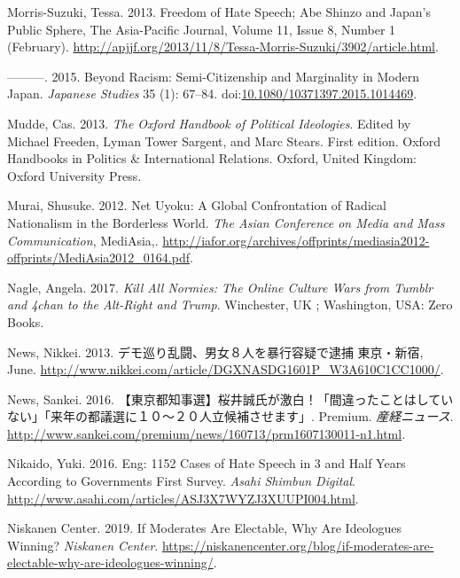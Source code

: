 \documentclass[10pt,british,A4paper,,openany]{memoir}
\begin{document}
\hypertarget{ref-morris-suzuki_freedom_2013}{}
Morris-Suzuki, Tessa. 2013. Freedom of Hate Speech; Abe Shinzo and
Japan's Public Sphere, The Asia-Pacific Journal, Volume 11, Issue 8,
Number 1 (February).
\url{http://apjjf.org/2013/11/8/Tessa-Morris-Suzuki/3902/article.html}.

\hypertarget{ref-morris-suzuki_beyond_2015}{}
---------. 2015. Beyond Racism: Semi-Citizenship and Marginality in
Modern Japan. \emph{Japanese Studies} 35 (1): 67--84.
doi:\href{https://doi.org/10.1080/10371397.2015.1014469}{10.1080/10371397.2015.1014469}.

\hypertarget{ref-mudde_oxford_2013}{}
Mudde, Cas. 2013. \emph{The Oxford Handbook of Political Ideologies}.
Edited by Michael Freeden, Lyman Tower Sargent, and Marc Stears. First
edition. Oxford Handbooks in Politics \& International Relations.
Oxford, United Kingdom: Oxford University Press.

\hypertarget{ref-murai_net_2012}{}
Murai, Shusuke. 2012. Net Uyoku: A Global Confrontation of Radical
Nationalism in the Borderless World. \emph{The Asian Conference on Media
and Mass Communication}, MediAsia,.
\url{http://iafor.org/archives/offprints/mediasia2012-offprints/MediAsia2012_0164.pdf}.

\hypertarget{ref-nagle_kill_2017}{}
Nagle, Angela. 2017. \emph{Kill All Normies: The Online Culture Wars
from Tumblr and 4chan to the Alt-Right and Trump}. Winchester, UK ;
Washington, USA: Zero Books.

\hypertarget{ref-nikkei_news__2013}{}
News, Nikkei. 2013. デモ巡り乱闘、男女８人を暴行容疑で逮捕 東京・新宿,
June. \url{http://www.nikkei.com/article/DGXNASDG1601P_W3A610C1CC1000/}.

\hypertarget{ref-sankei_news__2016}{}
News, Sankei. 2016.
【東京都知事選】桜井誠氏が激白！「間違ったことはしていない」「来年の都議選に１０～２０人立候補させます」.
Premium. \emph{産経ニュース}.
\url{http://www.sankei.com/premium/news/160713/prm1607130011-n1.html}.

\hypertarget{ref-nikaido_eng:_2016}{}
Nikaido, Yuki. 2016. Eng: 1152 Cases of Hate Speech in 3 and Half Years
According to Governments First Survey. \emph{Asahi Shimbun Digital}.
\url{http://www.asahi.com/articles/ASJ3X7WYZJ3XUUPI004.html}.

\hypertarget{ref-niskanen_center_if_2019}{}
Niskanen Center. 2019. If Moderates Are Electable, Why Are Ideologues
Winning? \emph{Niskanen Center}.
\url{https://niskanencenter.org/blog/if-moderates-are-electable-why-are-ideologues-winning/}.
\end{document}
